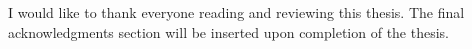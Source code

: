 I would like to thank everyone reading and reviewing this thesis. The final acknowledgments section will be inserted upon completion of the thesis.
